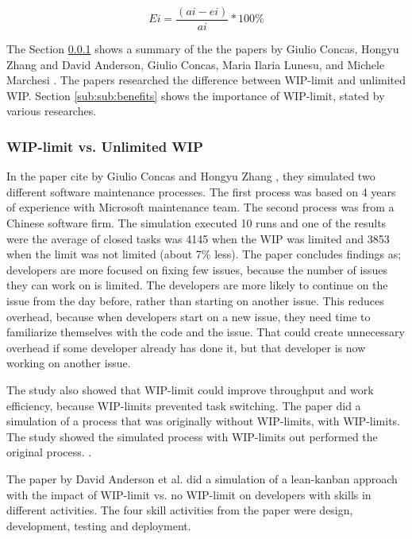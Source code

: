 \documentclass[UKenglish]{ifimaster}  %
\begin{document}
\begin{equation} \label{WIPEQ}
Ei=\frac{(ai-ei)}{ai}*100\%
\end{equation}

The Section \ref{sub:wip:vs:wip} shows a summary of the the papers by Giulio Concas, Hongyu Zhang \parencite{SMR:SMR1599}  and David Anderson, Giulio Concas, Maria Ilaria Lunesu, and Michele Marchesi \parencite{DavidAnderson}. The papers researched the difference between WIP-limit and unlimited WIP. Section \ref{sub:sub:benefits} shows the importance of WIP-limit, stated by various researches. 

\subsubsection {WIP-limit vs. Unlimited WIP}
\label{sub:wip:vs:wip}
In the paper cite by Giulio Concas and Hongyu Zhang \parencite{SMR:SMR1599}, they simulated two different software maintenance processes. The first process was based on 4 years of experience with Microsoft maintenance team. The second process was from a Chinese software firm.  The simulation executed 10 runs and one of the results were the average of closed tasks was 4145 when the WIP was limited and 3853 when the limit was not limited (about 7\% less). The paper concludes findings as; developers are more focused on fixing few issues, because the number of issues they can work on is limited. The developers are more likely to continue on the issue from the day before, rather than starting on another issue. This reduces overhead, because when developers start on a new issue, they need time to familiarize themselves with the code and the issue. That could create unnecessary overhead if some developer already has done it, but that developer is now working on another issue. 

The study also showed that WIP-limit could improve throughput and work efficiency, because WIP-limits prevented task switching. The paper  did a simulation of a process that was originally without WIP-limits, with WIP-limits. The study showed the simulated process with WIP-limits out performed the original process. \parencite{SMR:SMR1599}.

The paper by David Anderson et al. \parencite{DavidAnderson} did a simulation of a lean-kanban approach with the impact of WIP-limit vs. no WIP-limit on developers with skills in different activities. The four skill activities from the paper were design, development, testing and deployment. 
\end{document}
